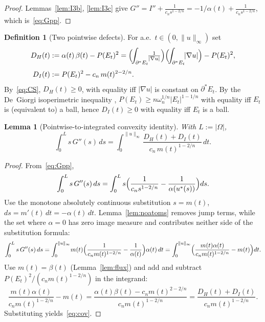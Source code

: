 \documentclass[11pt]{article}
\newtheorem{lemma}[theorem]{Lemma}
\theoremstyle{definition}
\newtheorem{definition}[theorem]{Definition}
\newcommand{\Om}{\Omega}
\begin{document}
\begin{proof}
Lemmas~\ref{lem:I3b}, \ref{lem:I3c} give $G''=I''+\frac{1}{c_{n}s^{1-2/n}}
=-1/\alpha(t)+\frac{1}{c_{n}s^{1-2/n}}$, which is~\eqref{eq:Gpp}.
\end{proof}

\begin{definition}[Two pointwise defects]\label{def:DHDI}
For a.e.\ $t\in(0,\|u\|_{\infty})$ set
\begin{align}
   D_{H}(t)&:=\alpha(t)\,\beta(t)-P(E_{t})^{2}
            =\Bigl(\!\int_{\partial^{*}E_{t}}\!\!\tfrac{1}{|\nabla u|}\Bigr)
              \Bigl(\!\int_{\partial^{*}E_{t}}\!\!|\nabla u|\Bigr)-P(E_{t})^{2},
              \label{eq:DH-def}\\[1mm]
   D_{I}(t)&:=P(E_{t})^{2}-c_{n}\,m(t)^{2-2/n}.
              \label{eq:DI-def}
\end{align}
By~\eqref{eq:CS}, $D_{H}(t)\ge 0$, with equality iff $|\nabla u|$ is
constant on $\partial^{*}E_{t}$. By the De~Giorgi isoperimetric
inequality \cite{DeGiorgi1958}, $P(E_{t})\ge n\omega_{n}^{1/n}|E_{t}|^{1-1/n}$
with equality iff $E_{t}$ is (equivalent to) a ball, hence
$D_{I}(t)\ge 0$ with equality iff $E_{t}$ is a ball.
\end{definition}

\begin{lemma}[Pointwise-to-integrated convexity identity]\label{lem:cov}
With $L:=|\Om|$,
\begin{equation}\label{eq:cov}
   \int_{0}^{L}s\,G''(s)\,ds
   =\int_{0}^{\|u\|_{\infty}}\frac{D_{H}(t)+D_{I}(t)}{c_{n}\,m(t)^{1-2/n}}\,dt.
\end{equation}
\end{lemma}

\begin{proof}
From~\eqref{eq:Gpp},
\[
   \int_{0}^{L}s\,G''(s)\,ds
   =\int_{0}^{L}s\Bigl(\frac{1}{c_{n}s^{1-2/n}}-\frac{1}{\alpha(u^{*}(s))}\Bigr)ds.
\]
Use the monotone absolutely continuous substitution $s=m(t)$,
$ds=m'(t)\,dt=-\alpha(t)\,dt$.  Lemma~\ref{lem:noatoms} removes jump
terms, while the set where $\alpha=0$ has zero image measure and
contributes neither side of the substitution formula:
\[
   \int_{0}^{L}s\,G''(s)\,ds
   =\int_{0}^{\|u\|_{\infty}}\!m(t)\Bigl(\frac{1}{c_{n}m(t)^{1-2/n}}-
      \frac{1}{\alpha(t)}\Bigr)\alpha(t)\,dt
   =\int_{0}^{\|u\|_{\infty}}\Bigl(
      \frac{m(t)\alpha(t)}{c_{n}m(t)^{1-2/n}}-m(t)\Bigr)dt.
\]
Use $m(t)=\beta(t)$ (Lemma~\ref{lem:flux}) and add and subtract
$P(E_{t})^{2}/(c_{n}m(t)^{1-2/n})$ in the integrand:
\[
   \frac{m(t)\alpha(t)}{c_{n}m(t)^{1-2/n}}-m(t)
   =\frac{\alpha(t)\beta(t)-c_{n}m(t)^{2-2/n}}{c_{n}m(t)^{1-2/n}}
   =\frac{D_{H}(t)+D_{I}(t)}{c_{n}m(t)^{1-2/n}}.
\]
Substituting yields~\eqref{eq:cov}.
\end{proof}
\end{document}
